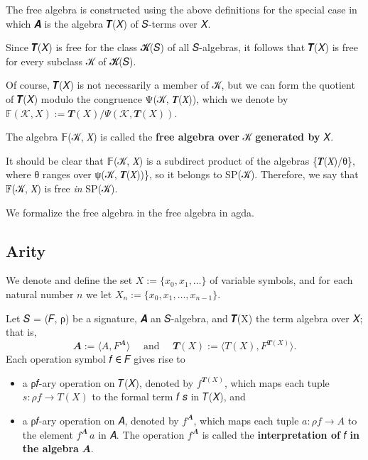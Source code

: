 \documentclass[sigplan,screen]{acmart}
\begin{document}
The free algebra is constructed using the above definitions for the special case in which 𝑨 is the algebra 𝑻(𝑋) of 𝑆-terms over 𝑋.

Since 𝑻(𝑋) is free for the class 𝓚(𝑆) of all 𝑆-algebras, it follows that 𝑻(𝑋) is free for every subclass 𝒦 of 𝓚(𝑆).

Of course, 𝑻(𝑋) is not necessarily a member of 𝒦, but we can form the quotient of 𝑻(𝑋) modulo the congruence Ψ(𝒦, 𝑻(𝑋)), which we denote by \(𝔽(𝒦, 𝑋) := 𝑻(𝑋)/Ψ(𝒦, 𝑻(𝑋))\).

The algebra 𝔽(𝒦, 𝑋) is called the \textbf{free algebra over} 𝒦 \textbf{generated by} 𝑋.

It should be clear that 𝔽(𝒦, 𝑋) is a subdirect product of the algebras \{𝑻(𝑋)/θ\}, where θ ranges over ψ(𝒦, 𝑻(𝑋))\}, so it belongs to SP(𝒦). Therefore, we say that 𝔽(𝒦, 𝑋) is free \emph{in} SP(𝒦).

We formalize the free algebra in the free algebra in agda.

\subsection{Arity}\label{arity}
We denote and define the set \(X := \{x_0,x_1,\dots \}\) of variable symbols, and for each natural number \(n\) we let \(X_n:=\{x_0,x_1,\dots, x_{n-1}\}\).

Let 𝑆 = (𝐹, ρ) be a signature, 𝑨 an 𝑆-algebra, and 𝑻(X) the term algebra over 𝑋; that is,
\[𝑨 := ⟨A, F^𝑨⟩ \quad \text{ and } \quad 𝑻(X) := ⟨T(X), F^{𝑻(X)}⟩.\]
Each operation symbol 𝑓 ∈ 𝐹 gives rise to
\begin{itemize}
\item a ρ𝑓-ary operation on 𝑇(𝑋), denoted by \(f^{𝑻(X)}\), which maps each tuple \(𝑠 : ρ𝑓 → 𝑇(𝑋)\) to the formal term 𝑓 𝑠 in 𝑇(𝑋), and
\item a ρ𝑓-ary operation on 𝐴, denoted by \(f^𝑨\), which maps each tuple \(𝑎 : ρ𝑓 → 𝐴\) to the element \(f^𝑨 \,a\) in 𝐴. The operation \(f^𝑨\) is called the \textbf{interpretation of} 𝑓 \textbf{in the algebra} \(𝑨\).
\end{itemize}
\end{document}
